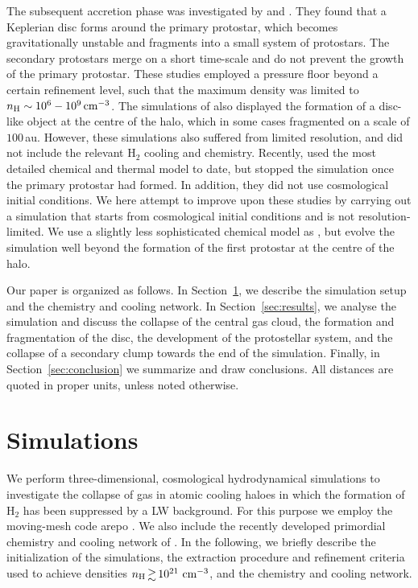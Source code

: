 \documentclass[useAMS,usenatbib]{mnras}
\newcommand{\cmmm}{\text{cm}^{-3}}
\newcommand{\HH}{\text{H}_2}          %
\newcommand{\nh}{n_{\rm H}}
\begin{document}
The subsequent accretion phase was investigated by \citet{Regan_2009} and \citet{Latif_2013b, Latif_2013a}. They found that a Keplerian disc forms around the primary protostar, which becomes gravitationally unstable and fragments into a small system of protostars. The secondary protostars merge on a short time-scale and do not prevent the growth of the primary protostar. These studies employed a pressure floor beyond a certain refinement level, such that the maximum density was limited to $\nh\sim 10^6-10^9\,\cmmm$. The simulations of \citet{Regan_2014a} also displayed the formation of a disc-like object at the centre of the halo, which in some cases fragmented on a scale of $100\,$au. However, these simulations also suffered from limited resolution, and did not include the relevant $\HH$ cooling and chemistry. Recently, \citet{Inayoshi_2014} used the most detailed chemical and thermal model to date, but stopped the simulation once the primary protostar had formed. In addition, they did not use cosmological initial conditions. We here attempt to improve upon these studies by carrying out a simulation that starts from cosmological initial conditions and is not resolution-limited. We use a slightly less sophisticated chemical model as \citet{Inayoshi_2014}, but evolve the simulation well beyond the formation of the first protostar at the centre of the halo.

Our paper is organized as follows. In Section~\ref{sec:simulations}, we describe the simulation setup and the chemistry and cooling network. In Section~\ref{sec:results}, we analyse the simulation and discuss the collapse of the central gas cloud, the formation and fragmentation of the disc, the development of the protostellar system, and the collapse of a secondary clump towards the end of the simulation. Finally, in Section~\ref{sec:conclusion} we summarize and draw conclusions. All distances are quoted in proper units, unless noted otherwise.

\section{Simulations}
\label{sec:simulations}

We perform three-dimensional, cosmological hydrodynamical simulations to investigate the collapse of gas in atomic cooling haloes in which the formation of $\HH$ has been suppressed by a LW background. For this purpose we employ the moving-mesh code {\sc arepo} \citep{Springel_2010}. We also include the recently developed primordial chemistry and cooling network of \citet{Greif_2014}. In the following, we briefly describe the initialization of the simulations, the extraction procedure and refinement criteria used to achieve densities $\nh \ga 10^{21}~\cmmm$, and the chemistry and cooling network.
\end{document}
